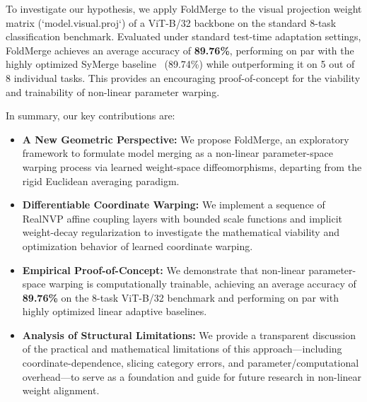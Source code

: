 To investigate our hypothesis, we apply FoldMerge to the visual projection weight matrix (`model.visual.proj`) of a ViT-B/32 backbone on the standard 8-task classification benchmark. 
Evaluated under standard test-time adaptation settings, FoldMerge achieves an average accuracy of \textbf{89.76\%}, performing on par with the highly optimized SyMerge baseline~\cite{jung2025symerge} (89.74\%) while outperforming it on 5 out of 8 individual tasks. 
This provides an encouraging proof-of-concept for the viability and trainability of non-linear parameter warping.

In summary, our key contributions are:
\begin{itemize}
    \item \textbf{A New Geometric Perspective:} We propose FoldMerge, an exploratory framework to formulate model merging as a non-linear parameter-space warping process via learned weight-space diffeomorphisms, departing from the rigid Euclidean averaging paradigm.
    \item \textbf{Differentiable Coordinate Warping:} We implement a sequence of RealNVP affine coupling layers with bounded scale functions and implicit weight-decay regularization to investigate the mathematical viability and optimization behavior of learned coordinate warping.
    \item \textbf{Empirical Proof-of-Concept:} We demonstrate that non-linear parameter-space warping is computationally trainable, achieving an average accuracy of \textbf{89.76\%} on the 8-task ViT-B/32 benchmark and performing on par with highly optimized linear adaptive baselines.
    \item \textbf{Analysis of Structural Limitations:} We provide a transparent discussion of the practical and mathematical limitations of this approach—including coordinate-dependence, slicing category errors, and parameter/computational overhead—to serve as a foundation and guide for future research in non-linear weight alignment.
\end{itemize}
